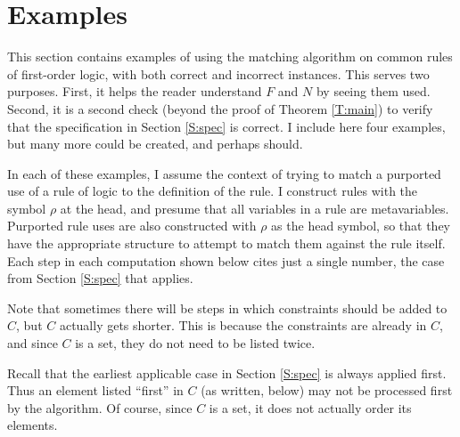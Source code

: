 \documentclass{article}
\begin{document}
\section{Examples}%

This section contains examples of using the matching algorithm on common rules of first-order logic, with both correct and incorrect instances.  This serves two purposes.  First, it helps the reader understand $F$ and $N$ by seeing them used.  Second, it is a second check (beyond the proof of Theorem \ref{T:main}) to verify that the specification in Section \ref{S:spec} is correct.  I include here four examples, but many more could be created, and perhaps should.

In each of these examples, I assume the context of trying to match a purported use of a rule of logic to the definition of the rule.  I construct rules with the symbol $\rho$ at the head, and presume that all variables in a rule are metavariables.  Purported rule uses are also constructed with $\rho$ as the head symbol, so that they have the appropriate structure to attempt to match them against the rule itself.  Each step in each computation shown below cites just a single number, the case from Section \ref{S:spec} that applies.

Note that sometimes there will be steps in which constraints should be added to $C$, but $C$ actually gets shorter.  This is because the constraints are already in $C$, and since $C$ is a set, they do not need to be listed twice.

Recall that the earliest applicable case in Section \ref{S:spec} is always applied first.  Thus an element listed ``first'' in $C$ (as written, below) may not be processed first by the algorithm.  Of course, since $C$ is a set, it does not actually order its elements.
\end{document}
